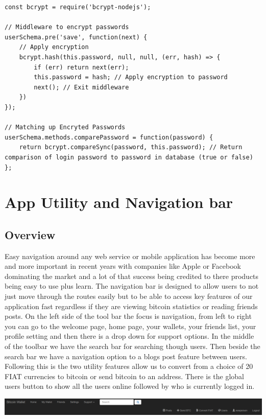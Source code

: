 \begin{lstlisting}
const bcrypt = require('bcrypt-nodejs');

// Middleware to encrypt passwords
userSchema.pre('save', function(next) {
    // Apply encryption
    bcrypt.hash(this.password, null, null, (err, hash) => {
        if (err) return next(err);
        this.password = hash; // Apply encryption to password
        next(); // Exit middleware
    })
});

// Matching up Encryted Passwords
userSchema.methods.comparePassword = function(password) {
    return bcrypt.compareSync(password, this.password); // Return comparison of login password to password in database (true or false)
};
\end{lstlisting}

\section{App Utility and Navigation bar}

\subsection{Overview}
Easy navigation around any web service or mobile application has become more and more important in recent years with companies like Apple or Facebook dominating the market and a lot of that success being credited to there products being easy to use plus learn. The navigation bar is designed to allow users to not just move through the routes easily but to be able to access key features of our application fast regardless if they are viewing bitcoin statistics or reading friends posts. On the left side of the tool bar the focus is navigation, from left to right you can go to the welcome page, home page, your wallets, your friends list, your profile setting and then there is a drop down for support options. In the middle of the toolbar we have the search bar for searching though users. Then beside the search bar we have a navigation option to a blogs post feature between users. Following this is the two utility features allow us to convert from a choice of 20 FIAT currencies to bitcoin or send bitcoin to an address. There is the global users button to show all the users online followed by who is currently logged in.

\includegraphics[]{img/ToolBar.png}

